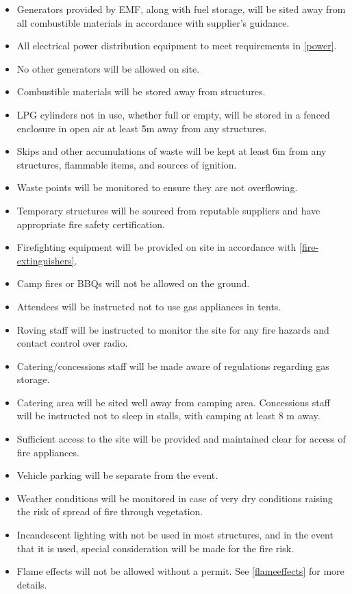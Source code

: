 \begin{itemize}
    \tightlist
    \item Generators provided by EMF, along with fuel storage, will be sited away from all
          combustible materials in accordance with supplier's guidance.
    \item All electrical power distribution equipment to meet requirements in \cref{power}.
    \item No other generators will be allowed on site.
    \item Combustible materials will be stored away from structures.
    \item LPG cylinders not in use, whether full or empty, will be stored in a fenced enclosure in open air at least 5m
          away from any structures.
    \item Skips and other accumulations of waste will be kept at least 6m from any structures, flammable items, and sources of ignition.
    \item Waste points will be monitored to ensure they are not overflowing.
    \item Temporary structures will be sourced from reputable suppliers and have appropriate fire safety certification.
    \item Firefighting equipment will be provided on site in accordance with \cref{fire-extinguishers}.
    \item Camp fires or BBQs will not be allowed on the ground.
    \item Attendees will be instructed not to use gas appliances in tents.
    \item Roving staff will be instructed to monitor the site for any fire hazards and contact control over radio.
    \item Catering/concessions staff will be made aware of regulations regarding gas storage.
    \item Catering area will be sited well away from camping area. Concessions staff will be instructed not to sleep in
          stalls, with camping at least 8 m away.
    \item Sufficient access to the site will be provided and maintained clear for access of fire appliances.
    \item Vehicle parking will be separate from the event.
    \item Weather conditions will be monitored in case of very dry conditions raising the risk of spread of fire through vegetation.
    \item Incandescent lighting with not be used in most structures, and in the event that it is used, special consideration will be made for the fire risk.
    \item Flame effects will not be allowed without a permit. See \cref{flameeffects} for more details.
\end{itemize}

